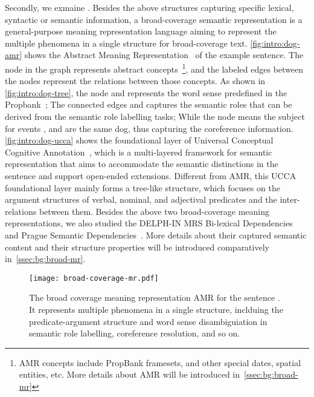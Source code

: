 Secondly, we exmaine . Besides the above structures capturing specific
lexical, syntactic or semantic information, a broad-coverage semantic
representation is a general-purpose meaning representation language
aiming to represent the multiple phenomena in a single structure for
broad-coverage text. \autoref{fig:intro:dog-amr} shows the Abstract
Meaning Representation~\citep[,][]{Ban:Bon:Cai:13} of the
example sentence. The node in the graph represents abstract
concepts~\footnote{AMR concepts include PropBank framesets, and other
  special dates, spatial entities, etc. More details about AMR will be
  introduced in~\autoref{ssec:bg:broad-mr}}, and the labeled edges
between the nodes represent the relations between those concepts. As
shown in \autoref{fig:intro:dog-tree}, the node  and
 represents the word sense predefined in the
Propbank~\cite{Kin:Pal:02}; The connected edges  and
 captures the semantic roles that can be derived from
the semantic role labelling tasks; While the node 
means the subject for events ,  and
 are the same dog, thus capturing the coreference
information. \autoref{fig:intro:dog-ucca} shows the foundational layer
of Universal Conceptual Cognitive
Annotation~\citep[,][]{Abe:Rap:13b}, which is a
multi-layered framework for semantic representation that aims to
accommodate the semantic distinctions in the sentence and support
open-ended extensions. Different from AMR, this UCCA foundational
layer mainly forms a tree-like structure, which focuses on the
argument structures of verbal, nominal, and adjectival predicates and
the inter-relations between them. Besides the above two broad-coverage
meaning representations, we also studied the DELPH-IN MRS Bi-lexical
Dependencies~\citep[,][]{ivanova2012did} and Prague Semantic
Dependencies~\citep[,][]{hajic2012announcing,miyao2014house}. More
details about their captured semantic content and their structure
properties will be introduced comparatively
in~\autoref{ssec:bg:broad-mr}.

\begin{figure}[!th]
\centering
\texttt{[image: broad-coverage-mr.pdf]}
\caption{\label{fig:intro:dog-amr} The broad coverage meaning
  representation AMR for the sentence \emph{}. It represents multiple
  phenomena in a single structure, inclduing the predicate-argument
  structure and word sense disambiguiation in semantic role labelling,
  coreference resolution, and so on.}
\end{figure}


